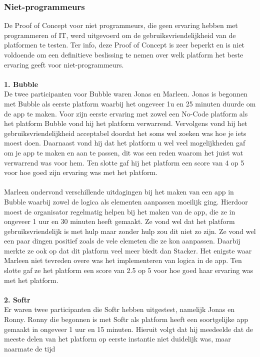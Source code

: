 \subsubsection{Niet-programmeurs}%
\label{subsubsec:niet-programmeurs}
De Proof of Concept voor niet programmeurs, die geen ervaring hebben met programmeren of IT, werd uitgevoerd om 
de gebruiksvriendelijkheid van de platformen te testen. Ter info, deze Proof of Concept is zeer beperkt en is niet voldoende om een definitieve beslissing te nemen over welk platform het beste ervaring geeft voor niet-programmeurs.
\\
\\
\textbf{1. Bubble}
\\
De twee participanten voor Bubble waren Jonas en Marleen. Jonas is begonnen met Bubble als eerste platform waarbij het ongeveer 1u en 25 minuten duurde om de app te maken.
Voor zijn eerste ervaring met zowel een No-Code platform als het platform Bubble vond hij het platform verwarrend. Vervolgens vond hij het gebruiksvriendelijkheid acceptabel doordat het soms
wel zoeken was hoe je iets moest doen. Daarnaast vond hij dat het platform u wel veel mogelijkheden gaf om je app te maken en aan te passen, dit was een reden waarom het juist wat verwarrend was voor hem.
Ten slotte gaf hij het platform een score van 4 op 5 voor hoe goed zijn ervaring was met het platform.
\\
\\
Marleen ondervond verschillende uitdagingen bij het maken van een app in Bubble waarbij zowel de logica als elementen aanpassen moeilijk ging. Hierdoor moest de organisator
regelmatig helpen bij het maken van de app, die ze in ongeveer 1 uur en 30 minuten heeft gemaakt. Ze vond wel dat het platform gebruiksvriendelijk is met hulp maar zonder hulp zou dit niet zo zijn. Ze vond wel een paar dingen positief zoals de vele elemeten die ze kon aanpassen. Daarbij merkte ze ook op 
dat dit platform veel meer biedt dan Stacker. Het enigste waar Marleen niet tevreden overe was het implementeren van logica in de app. Ten slotte gaf ze het platform een score van 2.5 op 5 voor hoe goed haar ervaring was met het platform.
\\
\\
\textbf{2. Softr}
\\
Er waren twee participanten die Softr hebben uitgestest, namelijk Jonas en Ronny. Ronny die begonnen is met Softr als platform heeft een soortgelijke app
gemaakt in ongeveer 1 uur en 15 minuten. Hieruit volgt dat hij meedeelde dat de meeste delen van het platform op eerste instantie niet duidelijk was, maar naarmate de tijd
